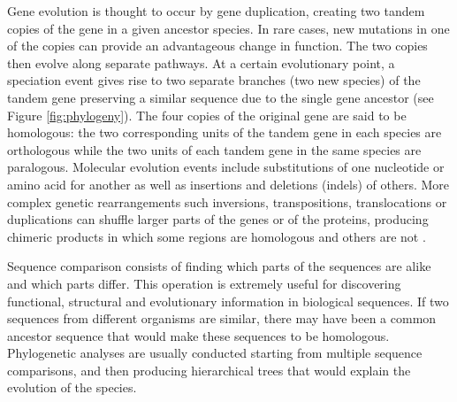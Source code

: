 \label{sec:}


Gene evolution is thought to occur by
gene duplication, creating two tandem copies of the gene in a given ancestor species. In rare 
cases, new mutations in one of the copies can provide an advantageous change in function. The two 
copies then evolve along separate pathways. At a certain evolutionary point, a speciation event 
gives rise to two separate branches (two new species) of the tandem gene preserving a similar 
sequence due to the single gene ancestor (see Figure \ref{fig:phylogeny}). The four copies of the 
original gene are said to be homologous:  
the two corresponding units of the tandem gene in each species are orthologous 
  while the two units of each tandem gene in the 
same species are paralogous.  
Molecular evolution events include substitutions of one nucleotide or amino acid for another as well
as insertions and deletions (indels) of others. More complex genetic rearrangements such inversions,
transpositions, translocations or duplications can shuffle larger parts of the genes or of the proteins, 
producing chimeric products in which some regions are homologous and others are not \citep{mount:2001a}.

Sequence comparison 
consists of finding which parts of the sequences are alike and which parts differ.
This operation is extremely useful for discovering functional, structural and evolutionary 
information in biological sequences. If two sequences from different organisms are similar, there may 
have been a common ancestor sequence that would make these sequences to be homologous. Phylogenetic analyses
are usually conducted starting from multiple sequence comparisons, and then producing hierarchical trees that 
would explain the evolution of the species.


\label{subsec:alphabets}

